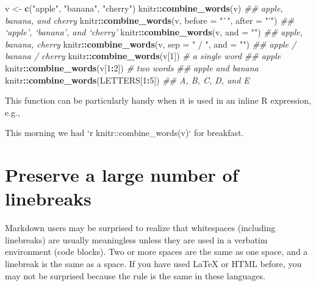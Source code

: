 \documentclass[
  11pt,
]{krantz}
\newenvironment{Shaded}{\begin{snugshade}}{\end{snugshade}}
\newcommand{\BaseNTok}[1]{\textcolor[rgb]{0.06,0.06,0.06}{#1}}
\newcommand{\CommentTok}[1]{\textcolor[rgb]{0.37,0.37,0.37}{\textit{#1}}}
\newcommand{\DataTypeTok}[1]{\textcolor[rgb]{0.27,0.27,0.27}{#1}}
\newcommand{\DecValTok}[1]{\textcolor[rgb]{0.06,0.06,0.06}{#1}}
\newcommand{\KeywordTok}[1]{\textcolor[rgb]{0.27,0.27,0.27}{\textbf{#1}}}
\newcommand{\NormalTok}[1]{#1}
\newcommand{\OperatorTok}[1]{\textcolor[rgb]{0.43,0.43,0.43}{\textbf{#1}}}
\newcommand{\StringTok}[1]{\textcolor[rgb]{0.5,0.5,0.5}{#1}}
\begin{document}
\begin{Shaded}
\begin{Highlighting}[]
\NormalTok{v <-}\StringTok{ }\KeywordTok{c}\NormalTok{(}\StringTok{"apple"}\NormalTok{, }\StringTok{"banana"}\NormalTok{, }\StringTok{"cherry"}\NormalTok{)}
\NormalTok{knitr}\OperatorTok{::}\KeywordTok{combine_words}\NormalTok{(v)}
\CommentTok{## apple, banana, and cherry}
\NormalTok{knitr}\OperatorTok{::}\KeywordTok{combine_words}\NormalTok{(v, }\DataTypeTok{before =} \StringTok{"`"}\NormalTok{, }\DataTypeTok{after =} \StringTok{"'"}\NormalTok{)}
\CommentTok{## `apple', `banana', and `cherry'}
\NormalTok{knitr}\OperatorTok{::}\KeywordTok{combine_words}\NormalTok{(v, }\DataTypeTok{and =} \StringTok{""}\NormalTok{)}
\CommentTok{## apple, banana, cherry}
\NormalTok{knitr}\OperatorTok{::}\KeywordTok{combine_words}\NormalTok{(v, }\DataTypeTok{sep =} \StringTok{" / "}\NormalTok{, }\DataTypeTok{and =} \StringTok{""}\NormalTok{)}
\CommentTok{## apple / banana / cherry}
\NormalTok{knitr}\OperatorTok{::}\KeywordTok{combine_words}\NormalTok{(v[}\DecValTok{1}\NormalTok{])  }\CommentTok{# a single word}
\CommentTok{## apple}
\NormalTok{knitr}\OperatorTok{::}\KeywordTok{combine_words}\NormalTok{(v[}\DecValTok{1}\OperatorTok{:}\DecValTok{2}\NormalTok{])  }\CommentTok{# two words}
\CommentTok{## apple and banana}
\NormalTok{knitr}\OperatorTok{::}\KeywordTok{combine_words}\NormalTok{(LETTERS[}\DecValTok{1}\OperatorTok{:}\DecValTok{5}\NormalTok{])}
\CommentTok{## A, B, C, D, and E}
\end{Highlighting}
\end{Shaded}

This function can be particularly handy when it is used in an inline R expression, e.g.,

\begin{Shaded}
\begin{Highlighting}[]
\NormalTok{This morning we had }\BaseNTok{`r knitr::combine_words(v)`}\NormalTok{ for breakfast.}
\end{Highlighting}
\end{Shaded}

\hypertarget{linebreaks}{%
\section{Preserve a large number of linebreaks}\label{linebreaks}}

Markdown users may be surprised to realize that whitespaces (including linebreaks) are usually meaningless unless they are used in a verbatim environment (code blocks). Two or more spaces are the same as one space, and a linebreak is the same as a space. If you have used LaTeX or HTML before, you may not be surprised because the rule is the same in these languages.
\end{document}
